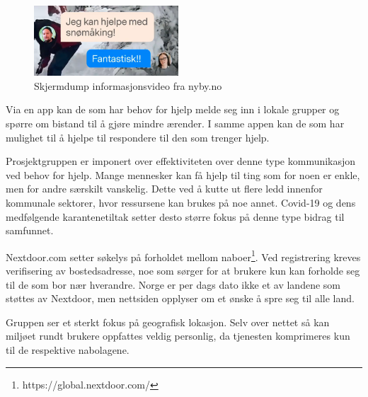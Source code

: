 \vspace{5mm} %
\begin{figure}
  \begin{center}
    \includegraphics[width=0.48\textwidth]{Illustrasjoner/andre_platformer/nyby_svar.png}
  \end{center}
  \caption{Skjermdump informasjonsvideo fra nyby.no}
\end{figure}
Via en app kan de som har behov for hjelp melde seg inn i lokale grupper og spørre om bistand til å gjøre mindre ærender. I samme appen kan de som har mulighet til å hjelpe til respondere til den som trenger hjelp.

\vspace{5mm} %

Prosjektgruppen er imponert over effektiviteten over denne type kommunikasjon ved behov for hjelp. Mange mennesker kan få hjelp til ting som for noen er enkle, men for andre særskilt vanskelig. Dette ved å kutte ut flere ledd innenfor kommunale sektorer, hvor ressursene kan brukes på noe annet. Covid-19 og dens medfølgende karantenetiltak setter desto større fokus på denne type bidrag til samfunnet.

\vspace{5mm} %

Nextdoor.com setter søkelys på forholdet mellom naboer\footnote{https://global.nextdoor.com/}. Ved registrering kreves verifisering av bostedsadresse, noe som sørger for at brukere kun kan forholde seg til de som bor nær hverandre. Norge er per dags dato ikke et av landene som støttes av Nextdoor, men nettsiden opplyser om et ønske å spre seg til alle land.

\vspace{5mm} %

Gruppen ser et sterkt fokus på geografisk lokasjon. Selv over nettet så kan miljøet rundt brukere oppfattes veldig personlig, da tjenesten komprimeres kun til de respektive nabolagene.

\vspace{5mm} %

